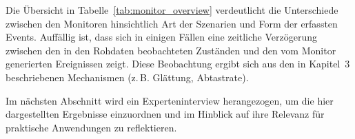 \noindent
Die Übersicht in Tabelle~\ref{tab:monitor_overview} verdeutlicht die Unterschiede
zwischen den Monitoren hinsichtlich Art der Szenarien und Form der erfassten Events.
Auffällig ist, dass sich in einigen Fällen eine zeitliche Verzögerung zwischen
den in den Rohdaten beobachteten Zuständen und den vom Monitor generierten
Ereignissen zeigt. Diese Beobachtung ergibt sich aus den in Kapitel~3 beschriebenen
Mechanismen (z.\,B. Glättung, Abtastrate).

Im nächsten Abschnitt wird ein Experteninterview herangezogen, um die hier
dargestellten Ergebnisse einzuordnen und im Hinblick auf ihre Relevanz für
praktische Anwendungen zu reflektieren.
